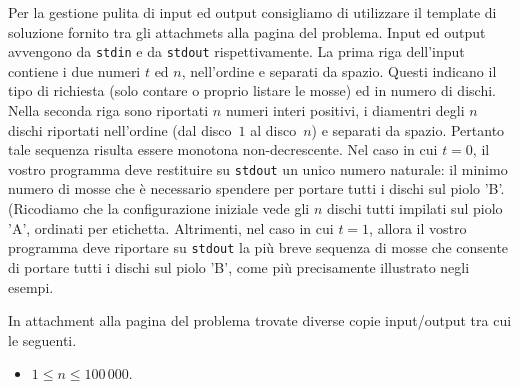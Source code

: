 
Per la gestione pulita di input ed output consigliamo di utilizzare il template di soluzione fornito tra gli attachmets alla pagina del problema.
Input ed output avvengono da \verb'stdin'
e da \verb'stdout' rispettivamente.
La prima riga dell'input contiene i due numeri $t$ ed $n$, nell'ordine e separati da spazio. Questi indicano il tipo di richiesta (solo contare o proprio listare le mosse) ed in numero di dischi.
Nella seconda riga sono riportati $n$ numeri interi positivi, i diamentri degli $n$ dischi riportati nell'ordine (dal disco~$1$ al disco~$n$) e separati da spazio. Pertanto tale sequenza risulta essere monotona non-decrescente.
Nel caso in cui $t=0$, il vostro programma deve restituire su \verb'stdout' un unico numero naturale: il minimo numero di mosse che è necessario spendere per portare tutti i dischi sul piolo 'B'.
(Ricodiamo che la configurazione iniziale vede gli $n$ dischi tutti impilati sul piolo 'A', ordinati per etichetta.
Altrimenti, nel caso in cui $t= 1$,
allora il vostro programma deve riportare su \verb'stdout'
la più breve sequenza di mosse che consente di portare tutti i dischi sul piolo 'B', come più precisamente illustrato negli esempi. 



In attachment alla pagina del problema trovate diverse copie input/output tra cui le seguenti.


\vspace{0.5cm}

\vspace{0.5cm}

\begin{itemize}[nolistsep, noitemsep]
  \item $1 \le n \le 100\,000$.
\end{itemize}
  

